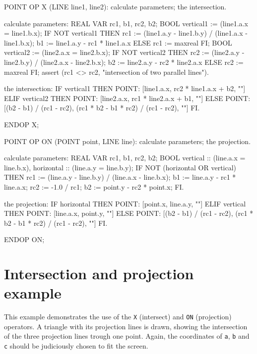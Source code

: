 \begin{elan}
POINT OP X (LINE line1, line2):
  calculate parameters;
  the intersection.

calculate parameters:
  REAL VAR rc1, b1, rc2, b2;
  BOOL vertical1 := (line1.a.x = line1.b.x);
  IF NOT vertical1
  THEN
    rc1 := (line1.a.y - line1.b.y) / (line1.a.x - line1.b.x);
    b1 := line1.a.y - rc1 * line1.a.x
  ELSE
    rc1 := maxreal
  FI;
  BOOL vertical2 := (line2.a.x = line2.b.x);
  IF NOT vertical2
  THEN
    rc2 := (line2.a.y - line2.b.y) / (line2.a.x - line2.b.x);
    b2 := line2.a.y - rc2 * line2.a.x
  ELSE
    rc2 := maxreal
  FI;
  assert (rc1 <> rc2, "intersection of two parallel lines").

the intersection:
  IF   vertical1
  THEN POINT: [line1.a.x, rc2 * line1.a.x + b2, ""]
  ELIF vertical2
  THEN POINT: [line2.a.x, rc1 * line2.a.x + b1, ""]
  ELSE POINT: [(b2 - b1) / (rc1 - rc2),
               (rc1 * b2 - b1 * rc2) / (rc1 - rc2),
               ""]
  FI.

ENDOP X;

POINT OP ON (POINT point, LINE line):
  calculate parameters;
  the projection.

calculate parameters:
  REAL VAR rc1, b1, rc2, b2;
  BOOL vertical :: (line.a.x = line.b.x),
       horizontal :: (line.a.y = line.b.y);
  IF NOT (horizontal OR vertical)
  THEN
    rc1 := (line.a.y - line.b.y) / (line.a.x - line.b.x);
    b1 := line.a.y - rc1 * line.a.x;
    rc2 := -1.0 / rc1;
    b2 := point.y - rc2 * point.x;
  FI.

the projection:
  IF   horizontal
  THEN POINT: [point.x, line.a.y, ""]
  ELIF vertical
  THEN POINT: [line.a.x, point.y, ""]
  ELSE POINT: [(b2 - b1) / (rc1 - rc2),
               (rc1 * b2 - b1 * rc2) / (rc1 - rc2),
               ""]
  FI.

ENDOP ON;
\end{elan}

\section{Intersection and projection example}

This example demonstrates the use of the {\tt X} (intersect) and
{\tt ON} (projection) operators.
A triangle with its projection lines is drawn, showing the
intersection of the three projection lines trough one point.
Again, the coordinates of {\tt a}, {\tt b} and {\tt c} should
be judiciously chosen to fit the screen.


